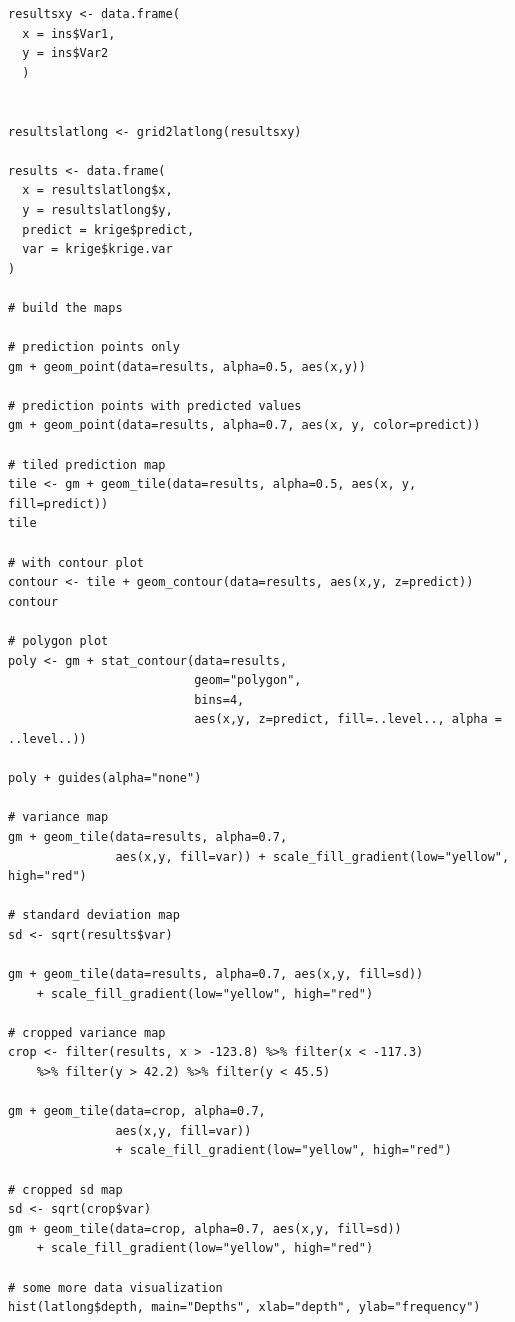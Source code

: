 \documentclass[12pt,twoside]{reedthesis}
\begin{document}
\begin{verbatim}
resultsxy <- data.frame(
  x = ins$Var1,
  y = ins$Var2
  )


resultslatlong <- grid2latlong(resultsxy)

results <- data.frame(
  x = resultslatlong$x,
  y = resultslatlong$y,
  predict = krige$predict,
  var = krige$krige.var
)

# build the maps

# prediction points only
gm + geom_point(data=results, alpha=0.5, aes(x,y))

# prediction points with predicted values
gm + geom_point(data=results, alpha=0.7, aes(x, y, color=predict))

# tiled prediction map
tile <- gm + geom_tile(data=results, alpha=0.5, aes(x, y, fill=predict))
tile

# with contour plot
contour <- tile + geom_contour(data=results, aes(x,y, z=predict))
contour

# polygon plot
poly <- gm + stat_contour(data=results, 
                          geom="polygon", 
                          bins=4, 
                          aes(x,y, z=predict, fill=..level.., alpha = ..level..))

poly + guides(alpha="none")

# variance map
gm + geom_tile(data=results, alpha=0.7,
               aes(x,y, fill=var)) + scale_fill_gradient(low="yellow", high="red")

# standard deviation map
sd <- sqrt(results$var)

gm + geom_tile(data=results, alpha=0.7, aes(x,y, fill=sd)) 
	+ scale_fill_gradient(low="yellow", high="red")

# cropped variance map
crop <- filter(results, x > -123.8) %>% filter(x < -117.3) 
	%>% filter(y > 42.2) %>% filter(y < 45.5)

gm + geom_tile(data=crop, alpha=0.7,
               aes(x,y, fill=var)) 
               + scale_fill_gradient(low="yellow", high="red")

# cropped sd map
sd <- sqrt(crop$var)
gm + geom_tile(data=crop, alpha=0.7, aes(x,y, fill=sd)) 
	+ scale_fill_gradient(low="yellow", high="red")

# some more data visualization
hist(latlong$depth, main="Depths", xlab="depth", ylab="frequency")

\end{verbatim}

  \backmatter %

    \nocite{*}
\end{document}
